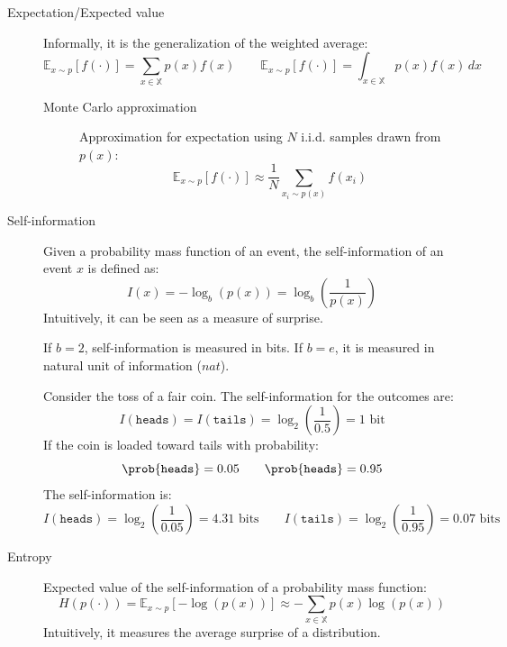 \begin{description}
    \item[Expectation/Expected value] 
        Informally, it is the generalization of the weighted average:
        \[ 
            \mathbb{E}_{x \sim p}[ f(\cdot) ] = \sum_{x \in \mathbb{X}} p(x) f(x) 
            \qquad
            \mathbb{E}_{x \sim p}[ f(\cdot) ] = \int_{x \in \mathbb{X}} p(x) f(x) \,dx
        \]

        \begin{description}
            \item[Monte Carlo approximation] 
                Approximation for expectation using $N$ i.i.d. samples drawn from $p(x)$:
                \[ \mathbb{E}_{x \sim p}[f(\cdot)] \approx \frac{1}{N} \sum_{x_i \sim p(x)} f(x_i) \]
        \end{description}

    \item[Self-information] 
        Given a probability mass function of an event, the self-information of an event $x$ is defined as:
        \[ I(x) = -\log_b(p(x)) = \log_b\left( \frac{1}{p(x)} \right) \]
        Intuitively, it can be seen as a measure of surprise.

        \begin{remark}
            If $b = 2$, self-information is measured in bits. If $b = e$, it is measured in natural unit of information ($nat$).
        \end{remark}

        \begin{example}
            Consider the toss of a fair coin. The self-information for the outcomes are:
            \[ I(\texttt{heads}) = I(\texttt{tails}) = \log_2\left( \frac{1}{0.5} \right) = 1 \text{ bit} \]
            If the coin is loaded toward tails with probability:
            \[ 
                \prob{\texttt{heads}} = 0.05 
                \qquad 
                \prob{\texttt{heads}} = 0.95 
            \]
            The self-information is:
            \[ 
                I(\texttt{heads}) = \log_2\left( \frac{1}{0.05} \right) = 4.31 \text{ bits}
                \qquad
                I(\texttt{tails}) = \log_2\left( \frac{1}{0.95} \right) = 0.07 \text{ bits}
            \]
        \end{example}

    \item[Entropy] 
        Expected value of the self-information of a probability mass function:
        \[ H(p(\cdot)) = \mathbb{E}_{x \sim p} \left[ - \log(p(x)) \right] \approx -\sum_{x \in \mathbb{X}} p(x) \log(p(x)) \]
        Intuitively, it measures the average surprise of a distribution.
        

\end{description}

